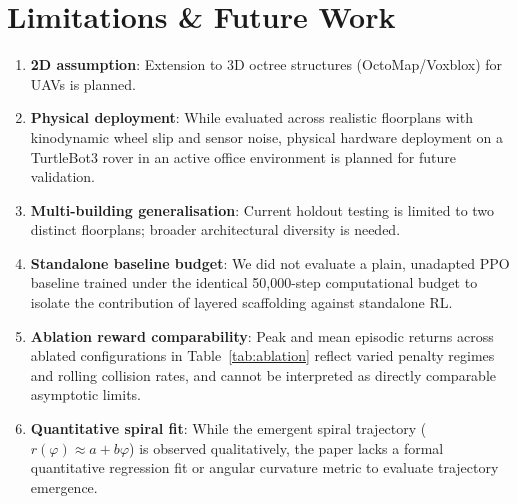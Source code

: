 \documentclass[conference]{IEEEtran}
\begin{document}
\section{Limitations \& Future Work}
\begin{enumerate}
    \item \textbf{2D assumption}: Extension to 3D octree structures (OctoMap/Voxblox) for UAVs is planned.
    \item \textbf{Physical deployment}: While evaluated across realistic floorplans with kinodynamic wheel slip and sensor noise, physical hardware deployment on a TurtleBot3 rover in an active office environment is planned for future validation.
    \item \textbf{Multi-building generalisation}: Current holdout testing is limited to two distinct floorplans; broader architectural diversity is needed.
    \item \textbf{Standalone baseline budget}: We did not evaluate a plain, unadapted PPO baseline trained under the identical 50{,}000-step computational budget to isolate the contribution of layered scaffolding against standalone RL.
    \item \textbf{Ablation reward comparability}: Peak and mean episodic returns across ablated configurations in Table~\ref{tab:ablation} reflect varied penalty regimes and rolling collision rates, and cannot be interpreted as directly comparable asymptotic limits.
    \item \textbf{Quantitative spiral fit}: While the emergent spiral trajectory ($r(\varphi) \approx a + b\varphi$) is observed qualitatively, the paper lacks a formal quantitative regression fit or angular curvature metric to evaluate trajectory emergence.
\end{enumerate}

\end{document}
